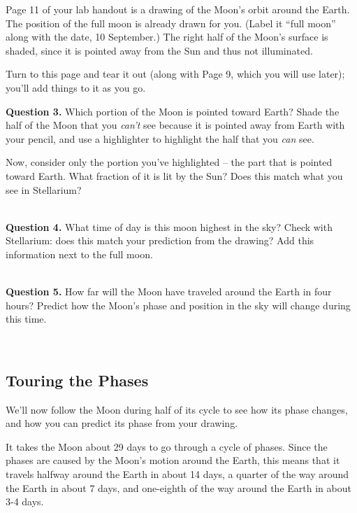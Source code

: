 \documentclass[11pt]{article}
\begin{document}
\newpage


Page 11 of your lab handout is a drawing of the Moon's orbit around the Earth. The position 
of the full moon is already drawn for you. (Label it ``full moon'' along with the date, 10 September.) The right half of the Moon's surface is shaded, since it is pointed away from the Sun and thus not illuminated.

Turn to this page and tear it out (along with Page 9, which you will use later); you'll add things to it as you go.\vspace{1cm}

\textbf{Question 3.} Which portion of the Moon is pointed toward Earth? Shade the half of the Moon that you {\it can't}
see because it is pointed away from Earth with your pencil, and use a highlighter to highlight the half that you {\it can} see.

Now, consider only the portion you've highlighted -- the part that is pointed toward Earth. What fraction of it is lit 
by the Sun? Does this match what you see in Stellarium?

\vspace*{1.5cm}

\hrulefill\\

\textbf{Question 4.} What time of day is this moon highest in the sky? Check with Stellarium: does this match your 
prediction from the drawing? Add this information next to the full moon.

\vspace*{1.5cm}

\hrulefill\\

\textbf{Question 5.} How far will the Moon have traveled around the Earth in four hours? Predict how the Moon's phase and position in the sky will change during this time. 

\vspace*{1.5cm}

\hrulefill\\


\subsection{Touring the Phases}


We'll now follow the Moon during half of its cycle to see how its phase changes, and how you can predict its phase from your drawing.

It takes the Moon about 29 days to go through a cycle of phases. Since the phases are caused by the Moon's motion around the Earth,
this means that it travels halfway around the Earth in about 14 days, a quarter of the way around the Earth in about 7 days, and one-eighth of the way around the Earth in about 3-4 days.
\end{document}
